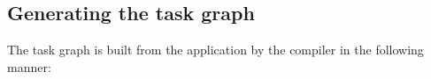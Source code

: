 \subsection{Generating the task graph}
\label{sec:build-appl-graph}


The task graph is built from the application by the compiler %
in the
following manner:

